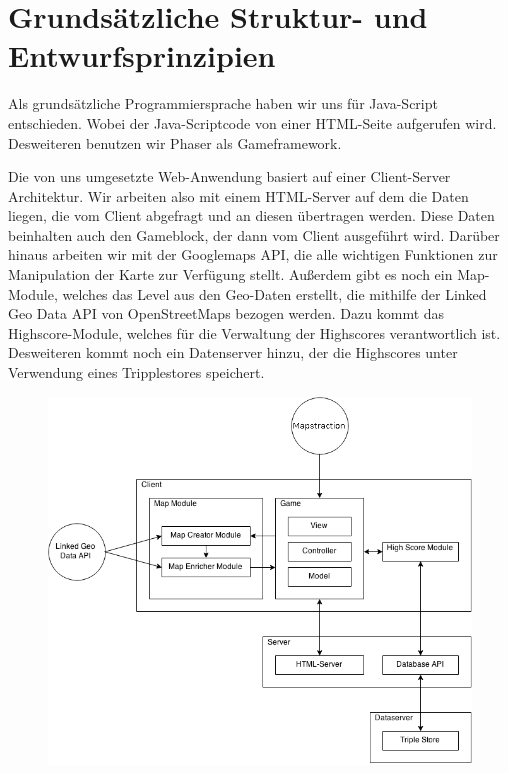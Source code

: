 \documentclass[11pt,a4paper]{article}
\begin{document}
\section{Grundsätzliche Struktur- und Entwurfsprinzipien}
Als grundsätzliche Programmiersprache haben wir uns für Java-Script entschieden. Wobei der Java-Scriptcode von einer HTML-Seite aufgerufen wird. Desweiteren benutzen wir Phaser als Gameframework.

Die von uns umgesetzte Web-Anwendung basiert auf einer Client-Server Architektur. Wir arbeiten also mit einem HTML-Server auf dem die Daten liegen, die vom Client abgefragt und an diesen übertragen werden. Diese Daten beinhalten auch den Gameblock, der dann vom Client ausgeführt wird. Darüber hinaus arbeiten wir mit der Googlemaps API, die alle wichtigen Funktionen zur Manipulation der Karte zur Verfügung stellt. Außerdem gibt es noch ein Map-Module, welches das Level aus den Geo-Daten erstellt, die mithilfe der Linked Geo Data API von OpenStreetMaps bezogen werden. Dazu kommt das Highscore-Module, welches für die Verwaltung der Highscores verantwortlich ist. Desweiteren kommt noch ein Datenserver hinzu, der die Highscores unter Verwendung eines Tripplestores speichert.\\
\begin{figure}[htb]
  \centering
  \includegraphics[scale=0.4]{arch.png}
  \label{PNFs}
\end{figure} 
\end{document}

